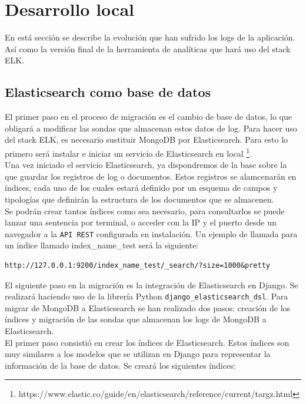 \documentclass[11pt,a4paper]{book}
\begin{document}
		\section{Desarrollo local}
			En está sección se describe la evolución que han sufrido los logs de la aplicación. Así como la versión final de la herramienta de analíticas que hará uso del stack ELK.
			\subsection{Elasticsearch como base de datos}
				El primer paso en el proceso de migración es el cambio de base de datos, lo que obligará a modificar las sondas que almacenan estos datos de log. Para hacer uso del stack ELK, es necesario sustituir MongoDB por Elasticsearch. Para esto lo primero será instalar e iniciar un servicio de Elasticsearch en local \footnote{https://www.elastic.co/guide/en/elasticsearch/reference/current/targz.html}.\\
				
				
				Una vez iniciado el servicio Elasticsearch, ya dispondremos de la base sobre la que guardar los registros de log o documentos. Estos registros se alamcenarán en índices, cada uno de los cuales estará definido por un esquema de campos y tipologías que definirán la estructura de los documentos que se almacenen.\\
				
				Se podrán crear tantos índices como sea necesario, para consultarlos se puede lanzar una sentencia por terminal, o acceder con la IP y el puerto desde un navegador a la \texttt{API REST} configurada en instalación. Un ejemplo de llamada para un índice llamado index\_name\_test será la siguiente:
				
				\begin{Verbatim}[tabsize=4]
http://127.0.0.1:9200/index_name_test/_search/?size=1000&pretty
				\end{Verbatim}
				
				El siguiente paso en la migración es la integración de Elasticsearch en Django. Se realizará haciendo uso de la librería Python \texttt{django\_elasticsearch\_dsl}. Para migrar de MongoDB a Elasticsearch se han realizado dos pasos: creación de los índices y migración de las sondas que almacenan los logs de MongoDB a Elasticsearch.\\
				
				
				El primer paso consistió en crear los índices de Elasticsearch. Estos índices son muy similares a los modelos que se utilizan en Django para representar la información de la base de datos. Se creará los siguientes índices: 				
\end{document}
